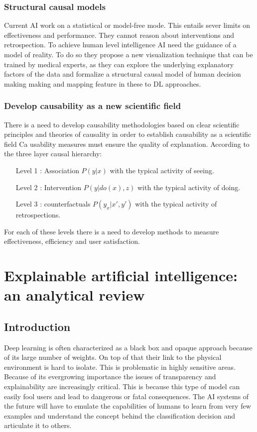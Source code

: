 		\subsubsection{Structural causal models}
		Current AI work on a statistical or model-free mode.
		This entails sever limits on effectiveness and performance.
		They cannot reason about interventions and retrospection.
		To achieve human level intelligence AI need the guidance of a model of reality.
		To do so they propose a new visualization technique that can be trained by medical experts, as they can explore the underlying explanatory factors of the data and formalize a structural causal model of human decision making making and mapping feature in these to DL approaches.

		\subsubsection{Develop causability as a new scientific field}
		There is a need to develop causability methodologies based on clear scientific principles and theories of causality in order to establish causability as a scientific field
		Ca usability measures must ensure the quality of explanation.
		According to the three layer causal hierarchy:

		\begin{itemize}
			\item[Level 1]: Association $P(y|x)$ with the typical activity of seeing.
			\item[Level 2]: Intervention $P(y|do(x), z)$ with the typical activity of doing.
			\item[Level 3]: counterfactuals $P(y_x|x', y')$ with the typical activity of retrospections.
		\end{itemize}

		For each of these levels there is a need to develop methods to measure effectiveness, efficiency and user satisfaction.

\section{Explainable artificial intelligence: an analytical review}

	\subsection{Introduction}
	Deep learning is often characterized as a black box and opaque approach because of its large number of weights.
	On top of that their link to the physical environment is hard to isolate.
	This is problematic in highly sensitive areas.
	Because of its evergrowing importance the issues of transparency and explainability are increasingly critical.
	This is because this type of model can easily fool users and lead to dangerous or fatal consequences.
	The AI systems of the future will have to emulate the capabilities of humans to learn from very few examples and understand the concept behind the classification decision and articulate it to others.

